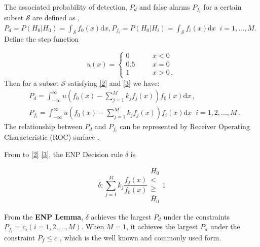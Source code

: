\documentclass[12pt,journal,a4paper,twoside,doublecolumn]{IEEEtran}
\begin{document}
\begin{spacing}{1.0}
The associated probability of detection, $P_d$ and false alarms $P_{f_i}$ for a certain subset $\mathcal{S}$ are defined as \cite{neyman1933problem}, $P_d = P(H_0 | H_0) = \int_{\mathcal{S}}f_0(x)\mathrm{d}x, P_{f_i} = P(H_0 | H_i) = \int_{\mathcal{S}}f_i(x)\mathrm{d}x\;\; i = 1, ..., M $. Define the step function

\begin{equation}
   \label{equ: step function}
   u(x) = \begin{cases}
     0\;\;\;\;\;\;&x < 0\\
     0.5\;\;\;\;\;\;&x=0\\
     1\;\;\;\;\;\;&x>0\,,
   \end{cases}
\end{equation}
Then for a subset $\mathcal{S}$ satisfying \eqref{2} and \eqref{3} we have:
\begin{equation}
\label{equ: pf and pd}
\begin{split}
&P_d = \int_{-\infty}^{\infty} u(f_0(x) - \sum_{j=1}^{M}k_jf_j(x)) f_0(x)\mathrm{d}x	\,, \\
&P_{f_i} = \int_{-\infty}^{\infty} u(f_0(x) - \sum_{j=1}^{M}k_jf_j(x)) f_i(x) \mathrm{d}x\;\;	 i=1, 2, ..., M\,.
\end{split}
\end{equation}
The relationship between $P_d$ and $P_{f_i}$ can be represented by Receiver Operating Characteristic (ROC) surface \cite{LehmannTest}.

From to \eqref{2} \eqref{3}, the ENP Decision rule $\delta$ is

\begin{equation}
\label{equ: decision rule}
\delta: \sum_{j=1}^{M}k_j\frac{f_j(x)}{f_0(x)} \substack{H_0 \\ < \\ \geq \\ \bar{H}_0} 1
\end{equation}

From the  \textbf{ENP Lemma}, $\delta$  achieves the largest $P_d$ under the constraints $P_{f_i} = c_i (i = 1, 2, ..., M)$.
When $M=1$, it achieves the largest $P_d$ under the constraint $P_f \leq c$ \cite{LehmannTest}, which is the well known and commonly used form.


\end{spacing}
\end{document}
